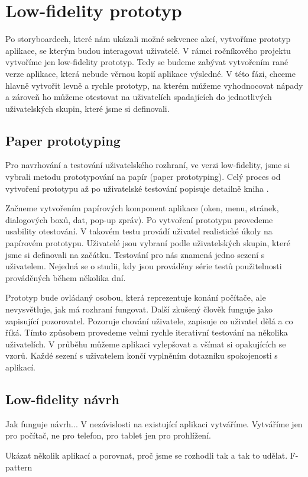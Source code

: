 \chapter{Low-fidelity prototyp}



Po storyboardech, které nám ukázali možné sekvence akcí, vytvoříme prototyp aplikace, se kterým budou interagovat uživatelé. V rámci ročníkového projektu vytvoříme jen low-fidelity prototyp. Tedy se budeme zabývat vytvořením rané verze aplikace, která nebude věrnou kopií aplikace výsledné. V této fázi, chceme hlavně vytvořit levně a rychle prototyp, na kterém můžeme vyhodnocovat nápady a zároveň ho můžeme otestovat na uživatelích spadajících do jednotlivých uživatelských skupin, které jsme si definovali.

\section{Paper prototyping}

Pro navrhování a testování uživatelského rozhraní, ve verzi low-fidelity, jsme si vybrali metodu prototypování na papír (paper prototyping). Celý proces od vytvoření prototypu až po uživatelské testování popisuje detailně kniha \cite{Paper_Prototyping}.

Začneme vytvořením papírových komponent aplikace (oken, menu, stránek, dialogových boxů, dat, pop-up zpráv). 
Po vytvoření prototypu provedeme usability otestování.
V takovém testu provádí uživatel realistické úkoly na papírovém prototypu. Uživatelé jsou vybraní podle uživatelských skupin, které jsme si definovali na začátku.
Testování pro nás znamená jedno sezení s uživatelem. Nejedná se o studii, kdy jsou prováděny série testů použitelnosti prováděných během několika dní.


Prototyp bude ovládaný osobou, která reprezentuje konání počítače, ale nevysvětluje, jak má rozhraní fungovat. Další zkušený člověk funguje jako zapisující pozorovatel. Pozoruje chování uživatele, zapisuje co uživatel dělá a co říká. Tímto způsobem provedeme velmi rychle iterativní testování na několika uživatelích. V průběhu můžeme aplikaci vylepšovat a všímat si opakujících se vzorů. Každé sezení s uživatelem končí vyplněním dotazníku spokojenosti s aplikací.

\section{Low-fidelity návrh}

Jak funguje návrh... V nezávislosti na existující aplikaci vytváříme.
Vytváříme jen pro počítač, ne pro telefon, pro tablet jen pro prohlížení.

Ukázat několik aplikací a porovnat, proč jsme se rozhodli tak a tak to udělat. F-pattern


